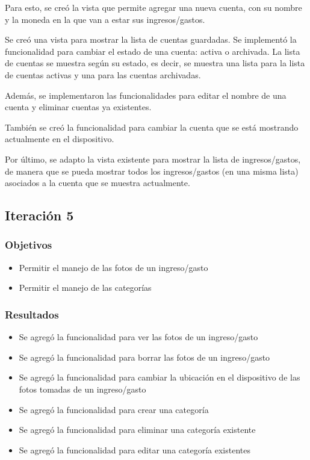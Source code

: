 Para esto, se creó la vista que permite agregar una nueva cuenta, con su nombre y la moneda en la que van a estar sus ingresos/gastos.

Se creó una vista para mostrar la lista de cuentas guardadas. Se implementó la funcionalidad para cambiar el estado de una cuenta: activa o archivada. La lista de cuentas se muestra según su estado, es decir, se muestra una lista para la lista de cuentas activas y una para las cuentas archivadas. 

Además, se implementaron las funcionalidades para editar el nombre de una cuenta y eliminar cuentas ya existentes.

También se creó la funcionalidad para cambiar la cuenta que se está mostrando actualmente en el dispositivo.

Por último, se adapto la vista existente para mostrar la lista de ingresos/gastos, de manera que se pueda mostrar todos los ingresos/gastos (en una misma lista) asociados a la cuenta que se muestra actualmente.




\subsection{Iteración 5}
\subsubsection{Objetivos}
\begin{itemize}
\item Permitir el manejo de las fotos de un ingreso/gasto
\item Permitir el manejo de las categorías
\end{itemize}

\subsubsection{Resultados}
\begin{itemize}
\item Se agregó la funcionalidad para ver las fotos de un ingreso/gasto
\item Se agregó la funcionalidad para borrar las fotos de un ingreso/gasto
\item Se agregó la funcionalidad para cambiar la ubicación en el dispositivo de las fotos tomadas de un ingreso/gasto
\item Se agregó la funcionalidad para crear una categoría
\item Se agregó la funcionalidad para eliminar una categoría existente
\item Se agregó la funcionalidad para editar una categoría existentes
\end{itemize}

